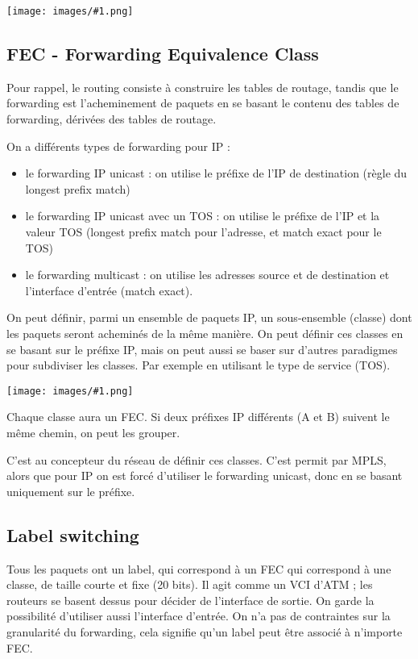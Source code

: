 \documentclass[10pt,a4paper]{report}
\newcommand{\dessin}[1]{\begin{center}\texttt{[image: images/\#1.png]}\end{center}}
\newcommand{\dessinS}[2]{\begin{center}\texttt{[image: images/\#1.png]}\end{center}}
\begin{document}
	\dessin{20}
	
		\subsection{FEC - Forwarding Equivalence Class}
		
		Pour rappel, le routing consiste à construire les tables de routage, tandis que le forwarding est l'acheminement de paquets en se basant le contenu des tables de forwarding, dérivées des tables de routage.
		
		On a différents types de forwarding pour IP :
		
		\begin{itemize}
			\item le forwarding IP unicast : on utilise le préfixe de l'IP de destination (règle du longest prefix match)
			\item le forwarding IP unicast avec un TOS : on utilise le préfixe de l'IP et la valeur TOS (longest prefix match pour l'adresse, et match exact pour le TOS)
			\item le forwarding multicast : on utilise les adresses source et de destination et l'interface d'entrée (match exact). 
		\end{itemize}
		
		On peut définir, parmi un ensemble de paquets IP, un sous-ensemble (classe) dont les paquets seront acheminés de la même manière. On peut définir ces classes en se basant sur le préfixe IP, mais on peut aussi se baser sur d'autres paradigmes pour subdiviser les classes. Par exemple en utilisant le type de service (TOS).
		
		\dessinS{21}{.5}
		
		Chaque classe aura un FEC. Si deux préfixes IP différents (A et B) suivent le même chemin, on peut les grouper.
		
		C'est au concepteur du réseau de définir ces classes. C'est permit par MPLS, alors que pour IP on est forcé d'utiliser le forwarding unicast, donc en se basant uniquement sur le préfixe.
		
		\subsection{Label switching}
		
		Tous les paquets ont un label, qui correspond à un FEC qui correspond à une classe, de taille courte et fixe (20 bits). Il agit comme un VCI d'ATM ; les routeurs se basent dessus pour décider de l'interface de sortie. On garde la possibilité d'utiliser aussi l'interface d'entrée. On n'a pas de contraintes sur la granularité du forwarding, cela signifie qu'un label peut être associé à n'importe FEC.
		
\end{document}
